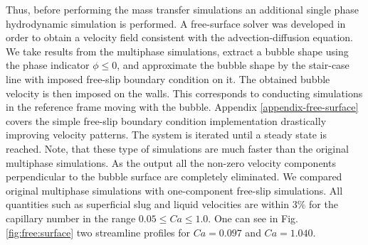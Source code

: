 \documentclass{article}
\begin{document}
\begin{description}
Thus, before performing the mass transfer simulations an additional single phase hydrodynamic
simulation is performed. A free-surface solver was developed in order to obtain a velocity field
consistent with the advection-diffusion equation. We take results from the
multiphase simulations, extract a
bubble shape using the phase indicator $\phi\leq0$, and approximate the bubble shape by the stair-case
line with imposed free-slip boundary condition on it. The obtained bubble velocity is then imposed on the walls. This corresponds to conducting 
simulations in the reference frame moving with the bubble. Appendix \ref{appendix-free-surface} covers the simple
free-slip boundary condition implementation drastically improving velocity patterns. The system is
iterated until a
steady state is reached. Note, that these type of simulations are much faster than the original
multiphase simulations. As the output all the non-zero velocity components perpendicular to the
bubble surface are completely eliminated. We compared original multiphase simulations with
one-component free-slip simulations. All quantities such as superficial slug and liquid velocities are
within $3\%$ for the capillary number in the range $0.05\leq Ca \leq 1.0$. 
One can see in Fig. \ref{fig:free:surface} two streamline profiles for $Ca=0.097$  and $Ca=1.040$.
\begin{figure}[htb!]

\end{figure}
\end{description}
\end{document}
